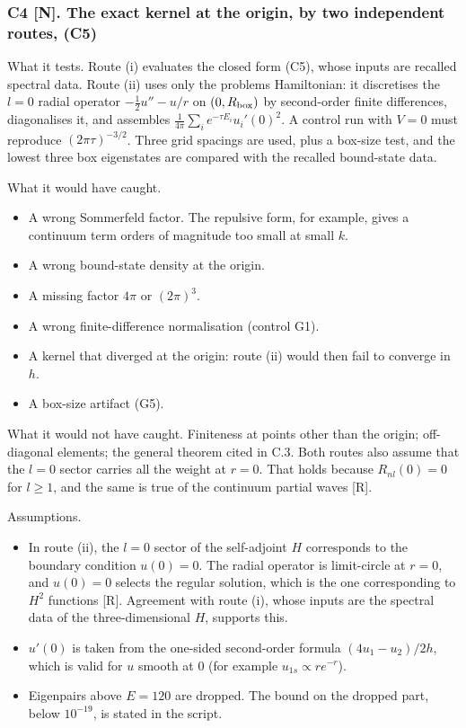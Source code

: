 \documentclass[11pt,a4paper]{article}
\newcommand{\tagmark}[1]{\marginnote{\scriptsize\ttfamily #1}}
\providecommand{\tightlist}{\setlength{\itemsep}{0pt}\setlength{\parskip}{0pt}}
\begin{document}
\hypertarget{c4-n.-the-exact-kernel-at-the-origin-by-two-independent-routes-c5}{%
\subsubsection{C4 {[}N{]}. The exact kernel at the origin, by two independent routes, (C5)}\label{c4-n.-the-exact-kernel-at-the-origin-by-two-independent-routes-c5}}

What it tests. Route (i) evaluates the closed form (C5), whose inputs are recalled spectral data. Route (ii) uses only the problem\textquotesingle s Hamiltonian: it discretises the \(l=0\) radial operator \(-\frac12u''-u/r\) on \((0,R_{\rm box})\) by second-order finite differences, diagonalises it, and assembles \(\frac1{4\pi}\sum_ie^{-\tau E_i}u_i'(0)^2\). A control run with \(V=0\) must reproduce \((2\pi\tau)^{-3/2}\). Three grid spacings are used, plus a box-size test, and the lowest three box eigenstates are compared with the recalled bound-state data.

What it would have caught.

\begin{itemize}
\tightlist
\item
  A wrong Sommerfeld factor. The repulsive form, for example, gives a continuum term orders of magnitude too small at small \(k\).
\item
  A wrong bound-state density at the origin.
\item
  A missing factor \(4\pi\) or \((2\pi)^3\).
\item
  A wrong finite-difference normalisation (control G1).
\item
  A kernel that diverged at the origin: route (ii) would then fail to converge in \(h\).
\item
  A box-size artifact (G5).
\end{itemize}

What it would not have caught. Finiteness at points other than the origin; off-diagonal elements; the general theorem cited in C.3. Both routes also assume that the \(l=0\) sector carries all the weight at \(r=0\). That holds because \(R_{nl}(0)=0\) for \(l\ge1\), and the same is true of the continuum partial waves {[}R{]}.

Assumptions.

\begin{itemize}
\tightlist
\item
  \tagmark{[A]} In route (ii), the \(l=0\) sector of the self-adjoint \(H\) corresponds to the boundary condition \(u(0)=0\). The radial operator is limit-circle at \(r=0\), and \(u(0)=0\) selects the regular solution, which is the one corresponding to \(H^2\) functions {[}R{]}. Agreement with route (i), whose inputs are the spectral data of the three-dimensional \(H\), supports this.
\item
  \tagmark{[A]} \(u'(0)\) is taken from the one-sided second-order formula \((4u_1-u_2)/2h\), which is valid for \(u\) smooth at 0 (for example \(u_{1s}\propto re^{-r}\)).
\item
  Eigenpairs above \(E=120\) are dropped. The bound on the dropped part, below \(10^{-19}\), is stated in the script.
\end{itemize}
\end{document}

